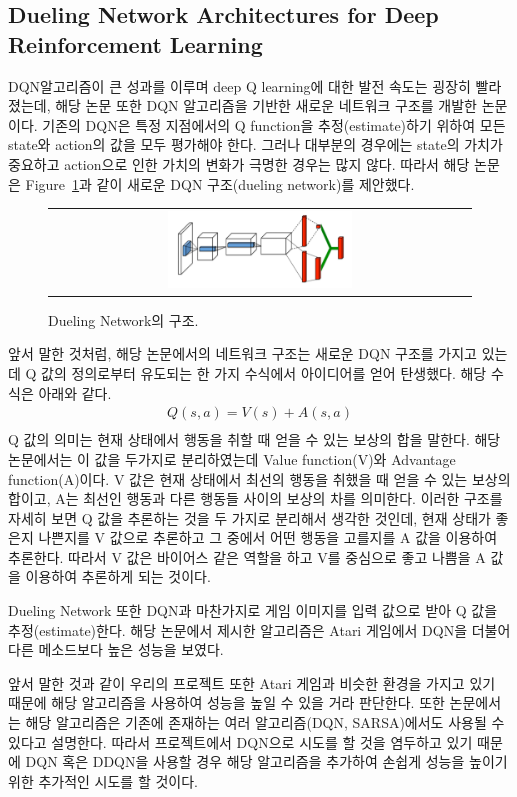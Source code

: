 \subsection{Dueling Network Architectures for Deep Reinforcement Learning}
DQN알고리즘이 큰 성과를 이루며 deep Q learning에 대한 발전 속도는 굉장히 빨라졌는데, 해당 논문 또한 DQN 알고리즘을 기반한 새로운 네트워크 구조를 개발한 논문이다. 
기존의 DQN은 특정 지점에서의 Q function을 추정(estimate)하기 위하여 모든 state와 action의 값을 모두 평가해야 한다. 
그러나 대부분의 경우에는 state의 가치가 중요하고 action으로 인한 가치의 변화가 극명한 경우는 많지 않다. 
따라서 해당 논문은 Figure~\ref{fig:dueling_network}과 같이 새로운 DQN 구조(dueling network)를 제안했다.

\begin{figure}[h]
\begin{center}
\begin{tabular}{c}
     \includegraphics[width=0.45\textwidth]{FIG/DuelingNetwork.png} \\
\end{tabular}
\caption{
	Dueling Network의 구조.
}
\label{fig:dueling_network}
\end{center}
\end{figure}

앞서 말한 것처럼, 해당 논문에서의 네트워크 구조는 새로운 DQN 구조를 가지고 있는데 Q 값의 정의로부터 유도되는 한 가지 수식에서 아이디어를 얻어 탄생했다. 
해당 수식은 아래와 같다. 
\begin{align*}
	Q(s,a) = V(s) + A(s,a) \\
\end{align*}
Q 값의 의미는 현재 상태에서 행동을 취할 때 얻을 수 있는 보상의 합을 말한다. 
해당 논문에서는 이 값을 두가지로 분리하였는데 Value function(V)와 Advantage function(A)이다. 
V 값은 현재 상태에서 최선의 행동을 취했을 때 얻을 수 있는 보상의 합이고, A는 최선인 행동과 다른 행동들 사이의 보상의 차를 의미한다. 
이러한 구조를 자세히 보면 Q 값을 추론하는 것을 두 가지로 분리해서 생각한 것인데, 현재 상태가 좋은지 나쁜지를 V 값으로 추론하고 그 중에서 어떤 행동을 고를지를 A 값을 이용하여 추론한다. 
따라서 V 값은 바이어스 같은 역할을 하고 V를 중심으로 좋고 나쁨을 A 값을 이용하여 추론하게 되는 것이다. 

Dueling Network 또한 DQN과 마찬가지로 게임 이미지를 입력 값으로 받아 Q 값을 추정(estimate)한다. 
해당 논문에서 제시한 알고리즘은 Atari 게임에서 DQN을 더불어 다른 메소드보다 높은 성능을 보였다.

앞서 말한 것과 같이 우리의 프로젝트 또한 Atari 게임과 비슷한 환경을 가지고 있기 때문에 해당 알고리즘을 사용하여 성능을 높일 수 있을 거라 판단한다. 
또한 논문에서는 해당 알고리즘은 기존에 존재하는 여러 알고리즘(DQN, SARSA)에서도 사용될 수 있다고 설명한다. 
따라서 프로젝트에서 DQN으로 시도를 할 것을 염두하고 있기 때문에 DQN 혹은 DDQN을 사용할 경우 해당 알고리즘을 추가하여 손쉽게 성능을 높이기 위한 추가적인 시도를 할 것이다.
